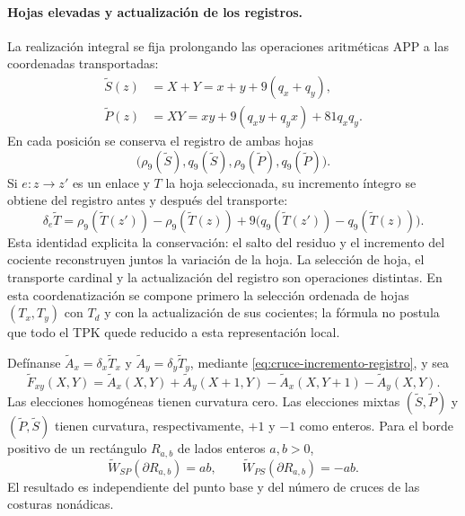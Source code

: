 \paragraph{Hojas elevadas y actualización de los registros.}
La realización integral se fija prolongando las operaciones aritméticas
APP a las coordenadas transportadas:
\begin{align*}
 \widetilde S(z)&=X+Y=x+y+9(q_x+q_y),\\
 \widetilde P(z)&=XY
 =xy+9(q_xy+q_yx)+81q_xq_y.
\end{align*}
En cada posición se conserva el registro de ambas hojas
\[
 \bigl(\rho_9(\widetilde S),q_9(\widetilde S),
       \rho_9(\widetilde P),q_9(\widetilde P)\bigr).
\]
Si $e:z\to z'$ es un enlace y $T$ la hoja seleccionada, su incremento
íntegro se obtiene del registro antes y después del transporte:
\begin{equation}
 \delta_e\widetilde T=
 \rho_9(\widetilde T(z'))-\rho_9(\widetilde T(z))
 +9\bigl(q_9(\widetilde T(z'))-q_9(\widetilde T(z))\bigr).
 \label{eq:cruce-incremento-registro}
\end{equation}
Esta identidad explicita la conservación: el salto del residuo y el
incremento del cociente reconstruyen juntos la variación de la hoja.
La selección de hoja, el transporte cardinal y la actualización del
registro son operaciones distintas. En esta coordenatización se compone primero la
selección ordenada de hojas $(T_x,T_y)$ con $T_d$ y con la actualización
de sus cocientes; la fórmula no postula que todo el TPK quede reducido
a esta representación local.

\begin{proposition}
\label{prop:cruce-stokes-integral}
Defínanse
$\widetilde A_x=\delta_x\widetilde T_x$ y
$\widetilde A_y=\delta_y\widetilde T_y$, mediante
\eqref{eq:cruce-incremento-registro}, y sea
\[
 \widetilde F_{xy}(X,Y)=
 \widetilde A_x(X,Y)+\widetilde A_y(X+1,Y)
 -\widetilde A_x(X,Y+1)-\widetilde A_y(X,Y).
\]
Las elecciones homogéneas tienen curvatura cero. Las elecciones mixtas
$(\widetilde S,\widetilde P)$ y
$(\widetilde P,\widetilde S)$ tienen curvatura, respectivamente,
$+1$ y $-1$ como enteros. Para el borde positivo de un rectángulo
$R_{a,b}$ de lados enteros $a,b>0$,
\[
 \widetilde W_{SP}(\partial R_{a,b})=ab,\qquad
 \widetilde W_{PS}(\partial R_{a,b})=-ab.
\]
El resultado es independiente del punto base y del número de cruces
de las costuras nonádicas.
\end{proposition}

